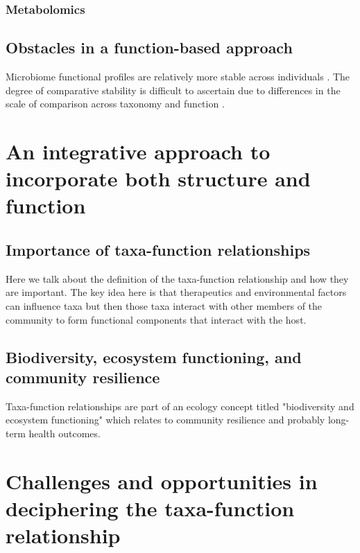 \subsubsection{Metabolomics}



 

\subsection{Obstacles in a function-based approach} 

Microbiome functional profiles are relatively more stable across individuals \cite{consortium2012structure}. The degree of comparative stability is difficult to ascertain due to differences in the scale of comparison across taxonomy and function \cite{langille2018exploring}. 

\section{An integrative approach to incorporate both structure and function}

\subsection{Importance of taxa-function relationships}
Here we talk about the definition of the taxa-function relationship and how they are important. The key idea here is that therapeutics and environmental factors can influence taxa but then those taxa interact with other members of the community to form functional components that interact with the host. 


\subsection{Biodiversity, ecosystem functioning, and community resilience}
Taxa-function relationships are part of an ecology concept titled "biodiversity and ecosystem functioning" which relates to community resilience and probably long-term health outcomes. 


\section{Challenges and opportunities in deciphering the taxa-function relationship}
